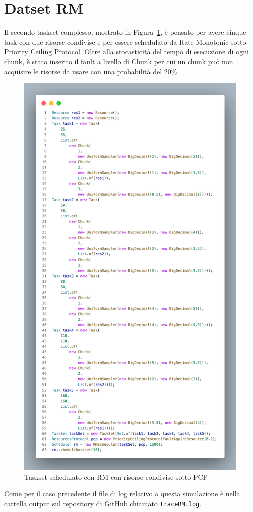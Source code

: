 \section{Datset RM}
Il secondo taskset complesso, mostrato in Figura~\ref{fig:datasetRM}, è pensato per avere cinque task con due risorse condivise e per essere schedulato da Rate Monotonic sotto Priority Ceiling Protocol. Oltre alla stocasticità del tempo di esecuzione di ogni chunk, è stato inserito il fault a livello di Chunk per cui un chunk può non acquisire le risorse da usare con una probabilità del 20\%.

\begin{figure}[htbp]
\includegraphics[width=.5\textwidth]{immagini/datasetRM.pdf}
\centering
\caption{Taskset schedulato con RM con risorse condivise sotto PCP}
\label{fig:datasetRM}

\end{figure}
Come per il caso precedente il file di log relativo a questa simulazione è nella cartella output sul repository di \href{https://github.com/edoardosarri24/real-time-scheduling-simulator.git}{GitHub} chiamato \texttt{traceRM.log}.